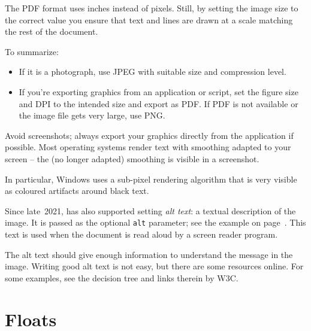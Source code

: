 The PDF format uses inches instead of pixels.
Still, by setting the image size to the correct value you ensure that
text and lines are drawn at a scale matching the rest of the document.


\begin{practices}
To summarize:
\begin{itemize}
\item If it is a photograph, use JPEG with suitable size and compression level.
\item If you're exporting graphics from an application or script,
    set the figure size and DPI to the intended size and export as PDF.
    If PDF is not available or the image file gets very large, use PNG.
\end{itemize}
\end{practices}


\begin{practices}
Avoid screenshots;
always export your graphics directly from the application if possible.
Most operating systems render text with smoothing adapted to your screen
-- the (no longer adapted) smoothing is visible in a screenshot.

In particular, Windows uses a sub-pixel rendering algorithm
that is very visible as coloured artifacts around black text.
\end{practices}


\begin{latexthree}
Since late~2021, 
has also supported setting \emph{alt text}: a textual description of the image.
It is passed as the optional \verb|alt| parameter;
see the example on page~\pageref{ex:alt text}.
This text is used when the document is read aloud by a screen reader program.

The alt text should give enough information to understand the message in the image.
Writing good alt text is not easy,
but there are some resources online.
For some examples, see the decision tree and links therein by W3C\footnotemark.
\end{latexthree}



%
%
%
\section{Floats}\label{sec:floats}


